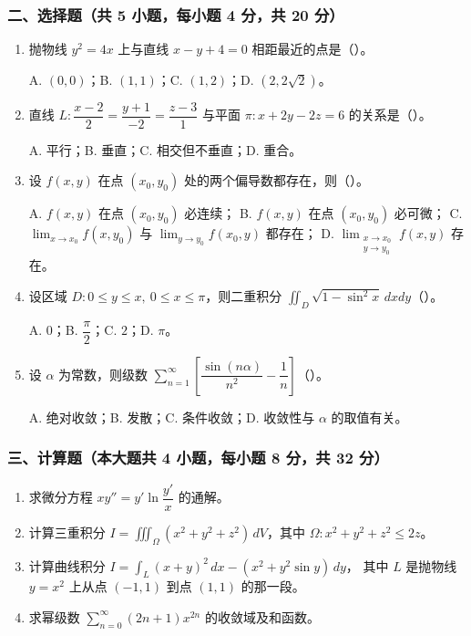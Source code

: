 \subsubsection*{二、选择题（共 5 小题，每小题 4 分，共 20 分）}
\begin{enumerate}
  \item 抛物线 $y^2=4x$ 上与直线 $x-y+4=0$ 相距最近的点是（\quad）。

  A. $(0,0)$；\quad B. $(1,1)$；\quad C. $(1,2)$；\quad D. $(2,2\sqrt2)$。

  \item 直线 $L:\dfrac{x-2}{2}=\dfrac{y+1}{-2}=\dfrac{z-3}{1}$ 与平面 $\pi:x+2y-2z=6$ 的关系是（\quad）。

  A. 平行；\quad B. 垂直；\quad C. 相交但不垂直；\quad D. 重合。

  \item 设 $f(x,y)$ 在点 $(x_0,y_0)$ 处的两个偏导数都存在，则（\quad）。

  A. $f(x,y)$ 在点 $(x_0,y_0)$ 必连续；\quad
  B. $f(x,y)$ 在点 $(x_0,y_0)$ 必可微；\quad
  C. $\displaystyle\lim_{x\to x_0}f(x,y_0)$ 与 $\displaystyle\lim_{y\to y_0}f(x_0,y)$ 都存在；\quad
  D. $\displaystyle\lim_{\substack{x\to x_0\\y\to y_0}}f(x,y)$ 存在。

  \item 设区域 $D:0\le y\le x,\ 0\le x\le\pi$，则二重积分 $\displaystyle\iint_D\sqrt{1-\sin^2x}\,dxdy$（\quad）。

  A. $0$；\quad B. $\dfrac{\pi}{2}$；\quad C. $2$；\quad D. $\pi$。

  \item 设 $\alpha$ 为常数，则级数 $\displaystyle\sum_{n=1}^{\infty}\left[\dfrac{\sin(n\alpha)}{n^2}-\dfrac1n\right]$（\quad）。

  A. 绝对收敛；\quad B. 发散；\quad C. 条件收敛；\quad D. 收敛性与 $\alpha$ 的取值有关。
\end{enumerate}

\subsubsection*{三、计算题（本大题共 4 小题，每小题 8 分，共 32 分）}
\begin{enumerate}
  \item 求微分方程 $xy''=y'\ln\dfrac{y'}{x}$ 的通解。
  \item 计算三重积分 $\displaystyle I=\iiint_{\Omega}(x^2+y^2+z^2)\,dV$，其中 $\Omega:x^2+y^2+z^2\le 2z$。
  \item 计算曲线积分 \(\displaystyle I=\int_L (x+y)^2\,dx-(x^2+y^2\sin y)\,dy\)，
  其中 $L$ 是抛物线 $y=x^2$ 上从点 $(-1,1)$ 到点 $(1,1)$ 的那一段。
  \item 求幂级数 $\displaystyle\sum_{n=0}^{\infty}(2n+1)x^{2n}$ 的收敛域及和函数。
\end{enumerate}

